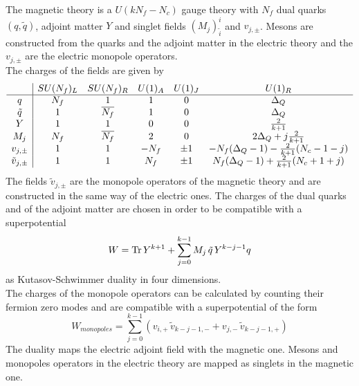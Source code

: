 The magnetic theory is a $U(k N_f - N_c)$ gauge theory with $N_f$ dual quarks $(q,\tilde{q})$, adjoint matter $Y$ and singlet fields $(M_j)^{i}_{\tilde{i}}$ and $v_{j,\pm}$. Mesons are constructed from the quarks and the adjoint matter in the electric theory and the $v_{j,\pm}$ are the electric monopole operators.\\
The charges of the fields are given by
\begin{equation}
\begin{array}{ c | c c c c c }
  & SU(N_f)_L & SU(N_f)_R & U(1)_A & U(1)_J  & U(1)_R   \\
 \hline
 q & N_f & 1& 1 & 0   & \Delta_Q  \\  
 \tilde{q} & 1 & \overline{N_f} & 1 & 0 & \Delta_Q      \\  
  Y & 1 & 1  & 0 & 0 & \frac{2}{k+1}  \\ 
  M_j & N_f & \overline{N_f} & 2  &  0& 2 \Delta_Q + j \frac{2}{k+1} \\
  v_{j,\pm} & 1  &1   & - N_f & \pm 1 & -N_f (\Delta_Q-1 ) - \frac{2}{k+1} (N_c-1 - j) \\
 \tilde{v}_{j,\pm} & 1  &1   & N_f & \pm 1 & N_f (\Delta_Q-1 ) + \frac{2}{k+1} (N_c + 1 + j) \\
\end{array}
\end{equation}
The fields $\tilde{v}_{j,\pm}$ are the monopole operators of the magnetic theory and are constructed in the same way of the electric ones.
The charges of the dual quarks and of the adjoint matter are chosen in order to be compatible with a superpotential 
\begin{equation}
W = \mathrm{Tr } \,{ Y^{k+1}} + \sum_{j=0}^{k-1} M_j \, \tilde{q}\, Y^{k - j - 1} q 
\end{equation}
as Kutasov-Schwimmer duality in four dimensions.\\
The charges of the monopole operators can be calculated by counting their fermion zero modes and are compatible with a superpotential of the form
\begin{equation}
W_{monopoles} = \sum_{j=0}^{k-1} \left(   v_{i,+} \, \tilde{v}_{k-j-1,-} + v_{j,-} \, \tilde{v}_{k-j-1,+} \right)
\end{equation}
The duality maps the electric adjoint field with the magnetic one.
Mesons and monopoles operators in the electric theory are mapped as singlets in the magnetic one. 